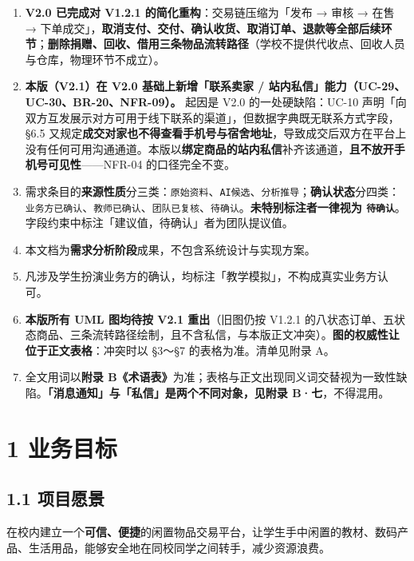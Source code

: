 \documentclass[12pt,a4paper]{ctexart}
\begin{document}
\begin{enumerate}[leftmargin=1.9em,itemsep=1pt,topsep=2pt]
\item \textbf{V2.0 已完成对 V1.2.1 的简化重构}：交易链压缩为「发布 → 审核 → 在售 → 下单成交」，\textbf{取消支付、交付、确认收货、取消订单、退款等全部后续环节}；\textbf{删除捐赠、回收、借用三条物品流转路径}（学校不提供代收点、回收人员与仓库，物理环节不成立）。
\item \textbf{本版（V2.1）在 V2.0 基础上新增「联系卖家 / 站内私信」能力（UC-29、UC-30、BR-20、NFR-09）。} 起因是 V2.0 的一处硬缺陷：UC-10 声明「向双方互发展示对方可用于线下联系的渠道」，但数据字典既无联系方式字段，§6.5 又规定\textbf{成交对家也不得查看手机号与宿舍地址}，导致成交后双方在平台上没有任何可用沟通通道。本版以\textbf{绑定商品的站内私信}补齐该通道，\textbf{且不放开手机号可见性}——NFR-04 的口径完全不变。
\item 需求条目的\textbf{来源性质}分三类：\texttt{原始资料}、\texttt{AI候选}、\texttt{分析推导}；\textbf{确认状态}分四类：\texttt{业务方已确认}、\texttt{教师已确认}、\texttt{团队已复核}、\texttt{待确认}。\textbf{未特别标注者一律视为 \texttt{待确认}}。字段约束中标注「建议值，待确认」者为团队提议值。
\item 本文档为\textbf{需求分析阶段}成果，不包含系统设计与实现方案。
\item 凡涉及学生扮演业务方的确认，均标注「教学模拟」，不构成真实业务方认可。
\item \textbf{本版所有 UML 图均待按 V2.1 重出}（旧图仍按 V1.2.1 的八状态订单、五状态商品、三条流转路径绘制，且不含私信，与本版正文冲突）。\textbf{图的权威性让位于正文表格}：冲突时以 §3～§7 的表格为准。清单见附录 A。
\item 全文用词以\textbf{附录 B《术语表》}为准；表格与正文出现同义词交替视为一致性缺陷。\textbf{「消息通知」与「私信」是两个不同对象，见附录 B·七}，不得混用。
\end{enumerate}




\section*{1 业务目标}

\subsection*{1.1 项目愿景}

在校内建立一个\textbf{可信、便捷}的闲置物品交易平台，让学生手中闲置的教材、数码产品、生活用品，能够安全地在同校同学之间转手，减少资源浪费。
\end{document}
